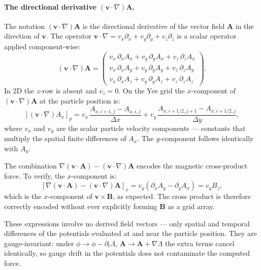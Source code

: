 \documentclass[11pt,a4paper]{article}
\newcommand{\vv}[1]{\mathbf{#1}}
\begin{document}
\paragraph{The directional derivative $(\vv{v}\cdot\nabla)\vv{A}$.}
The notation $(\vv{v}\cdot\nabla)\vv{A}$ is the directional derivative of the vector field $\vv{A}$ in the direction of $\vv{v}$.  The operator $\vv{v}\cdot\nabla = v_x\partial_x + v_y\partial_y + v_z\partial_z$ is a scalar operator applied component-wise:
\begin{equation}
  (\vv{v}\cdot\nabla)\vv{A} =
  \begin{pmatrix}
    v_x\,\partial_x A_x + v_y\,\partial_y A_x + v_z\,\partial_z A_x \\
    v_x\,\partial_x A_y + v_y\,\partial_y A_y + v_z\,\partial_z A_y \\
    v_x\,\partial_x A_z + v_y\,\partial_y A_z + v_z\,\partial_z A_z
  \end{pmatrix}.
\end{equation}
In 2D the $z$-row is absent and $v_z = 0$.  On the Yee grid the $x$-component of $(\vv{v}\cdot\nabla)\vv{A}$ at the particle position is:
\begin{equation}
  \left[(\vv{v}\cdot\nabla)A_x\right]_p = v_x\,\frac{A_{x,i+1,j} - A_{x,i,j}}{\Delta x}
                                         + v_y\,\frac{A_{x,i+1/2,j+1} - A_{x,i+1/2,j}}{\Delta y},
\end{equation}
where $v_x$ and $v_y$ are the scalar particle velocity components --- constants that multiply the spatial finite differences of $A_x$.  The $y$-component follows identically with $A_y$.

The combination $\nabla(\vv{v}\cdot\vv{A}) - (\vv{v}\cdot\nabla)\vv{A}$ encodes the magnetic cross-product force.  To verify, the $x$-component is:
\begin{equation}
  \left[\nabla(\vv{v}\cdot\vv{A}) - (\vv{v}\cdot\nabla)\vv{A}\right]_x
  = v_y(\partial_x A_y - \partial_y A_x) = v_y B_z,
\end{equation}
which is the $x$-component of $\vv{v}\times\vv{B}$, as expected.  The cross product is therefore correctly encoded without ever explicitly forming $\vv{B}$ as a grid array.

These expressions involve no derived field vectors --- only spatial and temporal differences of the potentials evaluated at and near the particle position.  They are gauge-invariant: under $\phi\to\phi-\partial_t\Lambda$, $\vv{A}\to\vv{A}+\nabla\Lambda$ the extra terms cancel identically, so gauge drift in the potentials does not contaminate the computed force.
\end{document}
